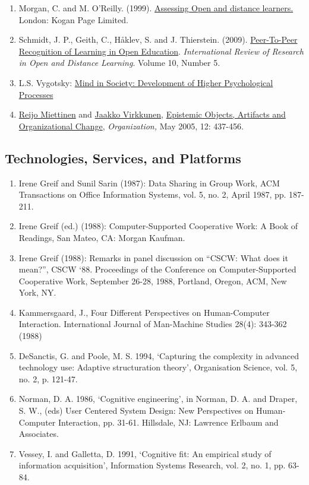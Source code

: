 \begin{enumerate}
\item
  Morgan, C. and M. O'Reilly. (1999).
  \href{http://www.amazon.com/Assessing-Distance-Learners-Flexible-Learning/dp/0749428783/ref=tmm\_pap\_title\_0?ie=UTF8\&qid=1388199564\&sr=1-1}{Assessing
  Open and distance learners.} London: Kogan Page Limited.
\item
  Schmidt, J. P., Geith, C., Håklev, S. and J. Thierstein. (2009).
  \href{http://www.irrodl.org/index.php/irrodl/article/view/641/1389}{Peer-To-Peer
  Recognition of Learning in Open Education}. \emph{International Review
  of Research in Open and Distance Learning}. Volume 10, Number 5.
\item
  L.S. Vygotsky:
  \href{http://books.google.com/books?id=RxjjUefze\_oC\&printsec=frontcover\&source=gbs\_atb\#v=onepage\&q\&f=false}{Mind
  in Society: Development of Higher Psychological Processes}
\item
  \href{http://org.sagepub.com/search?author1=Reijo+Miettinen\&sortspec=date\&submit=Submit}{Reijo
  Miettinen} and
  \href{http://org.sagepub.com/search?author1=Jaakko+Virkkunen\&sortspec=date\&submit=Submit}{Jaakko
  Virkkunen},
  \href{http://org.sagepub.com/content/12/3/437.abstract}{Epistemic
  Objects, Artifacts and Organizational Change}, \emph{Organization,}
  May 2005, 12: 437-456.
\end{enumerate}
\subsection{Technologies, Services, and Platforms}

\begin{enumerate}
\item
  Irene Greif and Sunil Sarin (1987): Data Sharing in Group Work, ACM
  Transactions on Office Information Systems, vol. 5, no. 2, April 1987,
  pp. 187-211.
\item
  Irene Greif (ed.) (1988): Computer-Supported Cooperative Work: A Book
  of Readings, San Mateo, CA: Morgan Kaufman.
\item
  Irene Greif (1988): Remarks in panel discussion on ``CSCW: What does
  it mean?'', CSCW `88. Proceedings of the Conference on
  Computer-Supported Cooperative Work, September 26-28, 1988, Portland,
  Oregon, ACM, New York, NY.
\item Kammersgaard, J., Four Different Perspectives on Human-Computer Interaction. International Journal of Man-Machine Studies 28(4): 343-362 (1988)
\item DeSanctis, G. and Poole, M. S. 1994, ‘Capturing the complexity in advanced technology use: Adaptive structuration theory’, Organisation Science, vol. 5, no. 2, p. 121-47.
\item Norman, D. A. 1986, ‘Cognitive engineering’, in Norman, D. A. and Draper, S. W., (eds) User Centered System Design: New Perspectives on Human-Computer Interaction, pp. 31-61. Hillsdale, NJ: Lawrence Erlbaum and Associates.
\item Vessey, I. and Galletta, D. 1991, ‘Cognitive fit: An empirical study of information acquisition’, Information Systems Research, vol. 2, no. 1, pp. 63-84.
\end{enumerate}

